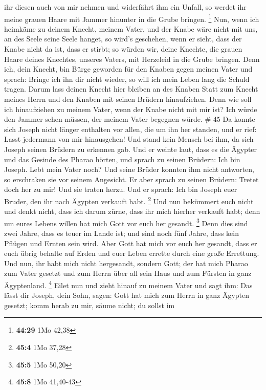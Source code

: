 ihr diesen auch von mir nehmen und widerfährt ihm ein Unfall, so werdet
ihr meine grauen Haare mit Jammer hinunter in die Grube bringen.
\footnote{\textbf{44:29} 1Mo 42,38}  Nun, wenn ich
heimkäme zu deinem Knecht, meinem Vater, und der Knabe wäre nicht mit
uns, an des Seele seine Seele hanget,  so wird's
geschehen, wenn er sieht, dass der Knabe nicht da ist, dass er stirbt;
so würden wir, deine Knechte, die grauen Haare deines Knechtes, unseres
Vaters, mit Herzeleid in die Grube bringen.  Denn ich,
dein Knecht, bin Bürge geworden für den Knaben gegen meinen Vater und
sprach: Bringe ich ihn dir nicht wieder, so will ich mein Leben lang die
Schuld tragen.  Darum lass deinen Knecht hier bleiben an
des Knaben Statt zum Knecht meines Herrn und den Knaben mit seinen
Brüdern hinaufziehen.  Denn wie soll ich hinaufziehen zu
meinem Vater, wenn der Knabe nicht mit mir ist? Ich würde den Jammer
sehen müssen, der meinem Vater begegnen würde. \# 45  Da
konnte sich Joseph nicht länger enthalten vor allen, die um ihn her
standen, und er rief: Lasst jedermann von mir hinausgehen! Und stand
kein Mensch bei ihm, da sich Joseph seinen Brüdern zu erkennen gab.
 Und er weinte laut, dass es die Ägypter und das Gesinde
des Pharao hörten,  und sprach zu seinen Brüdern: Ich bin
Joseph. Lebt mein Vater noch? Und seine Brüder konnten ihm nicht
antworten, so erschraken sie vor seinem Angesicht.  Er
aber sprach zu seinen Brüdern: Tretet doch her zu mir! Und sie traten
herzu. Und er sprach: Ich bin Joseph euer Bruder, den ihr nach Ägypten
verkauft habt. \footnote{\textbf{45:4} 1Mo 37,28}  Und nun
bekümmert euch nicht und denkt nicht, dass ich darum zürne, dass ihr
mich hierher verkauft habt; denn um eures Lebens willen hat mich Gott
vor euch her gesandt. \footnote{\textbf{45:5} 1Mo 50,20} 
Denn dies sind zwei Jahre, dass es teuer im Lande ist; und sind noch
fünf Jahre, dass kein Pflügen und Ernten sein wird.  Aber
Gott hat mich vor euch her gesandt, dass er euch übrig behalte auf Erden
und euer Leben errette durch eine große Errettung.  Und
nun, ihr habt mich nicht hergesandt, sondern Gott; der hat mich Pharao
zum Vater gesetzt und zum Herrn über all sein Haus und zum Fürsten in
ganz Ägyptenland. \footnote{\textbf{45:8} 1Mo 41,40-43} 
Eilet nun und zieht hinauf zu meinem Vater und sagt ihm: Das lässt dir
Joseph, dein Sohn, sagen: Gott hat mich zum Herrn in ganz Ägypten
gesetzt; komm herab zu mir, säume nicht;  du sollst im
